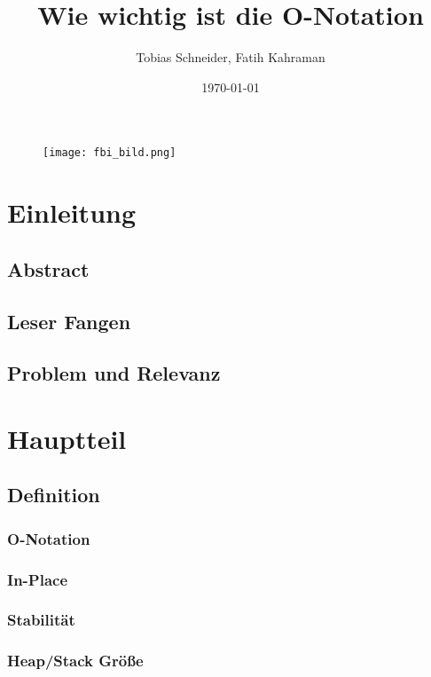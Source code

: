 \documentclass{article}
\title{Wie wichtig ist die O-Notation}
\author{Tobias Schneider, Fatih Kahraman}
\date{\today}
\begin{document}
\begin{figure}
\texttt{[image: fbi\_bild.png]}
\end{figure}

\maketitle %
\thispagestyle{empty} %
\newpage{}

\tableofcontents{}%
\setcounter{page}{1} %
\newpage{}


\section{Einleitung}
\subsection{Abstract}
\subsection{Leser Fangen}
\subsection{Problem und Relevanz}

\section{Hauptteil}
\subsection{Definition}
\subsubsection{O-Notation}
\subsubsection{In-Place}
\subsubsection{Stabilität}
\subsubsection{Heap/Stack Größe}
\end{document}
